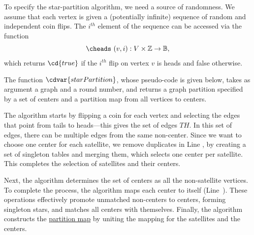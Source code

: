 \begin{flex}

\begin{algorithm}
\label{alg:graphcon::star-partition}

To specify the star-partition algorithm, we need
a source of randomness.
%
We assume that each vertex is given a (potentially infinite) sequence
of random and independent coin flips. The $i^{th}$ element of the
sequence can be accessed via the function
\[
\cheads~(v,i) : V \times \mathbb{Z} \to \mathbb{B}, 
\]
which returns $\cd{true}$ if the $i^{th}$ flip on vertex $v$ is heads
and false otherwise. 

The function $\cdvar{starPartition}$, whose pseudo-code is given
below, takes as argument a graph and a round number, and returns a
graph partition specified by a set of centers and a partition map from
all vertices to centers.
%

The algorithm starts by flipping a coin for each vertex and selecting
the edges that point from tails to heads---this gives the set of edges
$\mathit{TH}$.
%
In this set of edges, there can be multiple edges from the same
non-center. Since we want to choose one center for each satellite, we
remove duplicates in Line \linegcstarmerge{}, by creating a set of
singleton tables and merging them, which selects one center per
satellite.
%
This completes the selection of satellites and their centers. 
%

Next, the algorithm determines the set of centers as all the
non-satellite vertices.
%
To complete the process, the algorithm maps each center to itself
(Line~\linegcstarself{}).
%
These operations effectively promote unmatched non-centers to centers,
forming singleton stars, and matches all centers with themselves.
%
Finally, the algorithm constructs the
%
\href{def:graphcon::intro::prelim::partition-map}{partition map} 
%
by uniting the mapping for the satellites and the centers.
%


\end{algorithm}
\end{flex}
